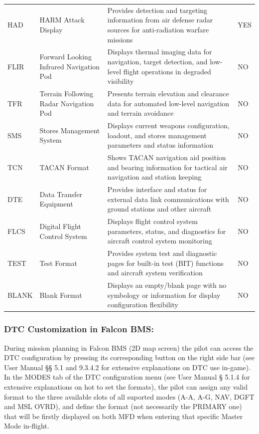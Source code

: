 \documentclass[11pt, a4paper, twoside]{report}
\begin{document}
\begin{longtable}{L{1.8cm} L{4.5cm} L{7.5cm} L{2.0cm}}
	HAD & HARM Attack Display & Provides detection and targeting information from air defense radar sources for anti-radiation warfare missions & YES \\
	
	FLIR & Forward Looking Infrared Navigation Pod & Displays thermal imaging data for navigation, target detection, and low-level flight operations in degraded visibility & NO \\
	
	TFR & Terrain Following Radar Navigation Pod & Presents terrain elevation and clearance data for automated low-level navigation and terrain avoidance & NO \\
	
	SMS & Stores Management System & Displays current weapons configuration, loadout, and stores management parameters and status information & NO \\
	
	TCN & TACAN Format & Shows TACAN navigation aid position and bearing information for tactical air navigation and station keeping & NO \\
	
	DTE & Data Transfer Equipment & Provides interface and status for external data link communications with ground stations and other aircraft & NO \\
	
	FLCS & Digital Flight Control System & Displays flight control system parameters, status, and diagnostics for aircraft control system monitoring & NO \\
	
	TEST & Test Format & Provides system test and diagnostic pages for built-in test (BIT) functions and aircraft system verification & NO \\
	
	BLANK & Blank Format & Displays an empty/blank page with no symbology or information for display configuration flexibility & NO \\
	
\end{longtable}
\subsubsection{DTC Customization in Falcon BMS:}
\label{sec:C3-S4-S2-S2}

During mission planning in Falcon BMS (2D map screen) the pilot can access the DTC configuration by pressing its corresponding button on the right side bar (see User Manual §§ 5.1 and 9.3.4.2 for extensive explanations on DTC use in-game). In the MODES tab of the DTC configuration menu (see User Manual § 5.1.4 for extensive explanations on hot to set the formats), the pilot can assign any valid format to the three available slots of all suported modes (A-A, A-G, NAV, DGFT and MSL OVRD), and define the format (not necessarily the PRIMARY one) that will be firstly displayed on both MFD when entering that specific Master Mode in-flight.
\end{document}
